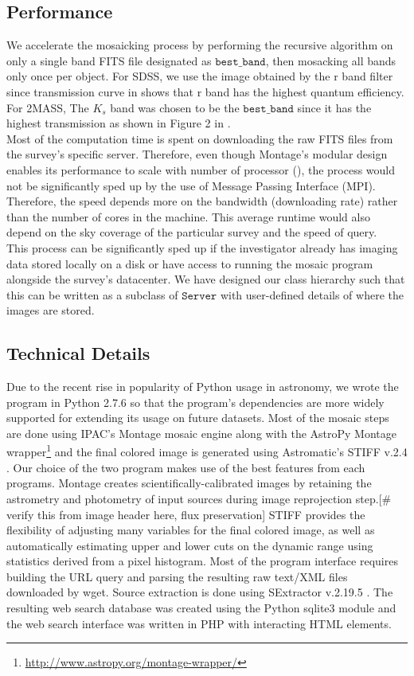 \documentclass[5p]{elsarticle}
\begin{document}
	\subsection{Performance}	
	\indent We accelerate the mosaicking process by performing the recursive algorithm on only a single band FITS file designated as $\texttt{best\_band}$, then mosacking all bands only once per object. For SDSS, we use the image obtained by the r band filter since transmission curve in \citet{edr} shows that r band has the highest quantum efficiency. For 2MASS, The $K_s$ band was chosen to be the $\texttt{best\_band}$ since it has the highest transmission as shown  in Figure 2 in \citet{2mass}.
	\\
	 \indent  Most of the computation time is spent on downloading the raw FITS files from the survey's specific server. Therefore, even though Montage's modular design enables its performance to scale with number of processor  (\citet{montage}), the process would not be significantly sped up by the use of Message Passing Interface (MPI). Therefore, the speed depends more on the bandwidth (downloading rate) rather than the number of cores in the machine. This average runtime would also depend on the sky coverage of the  particular survey and the speed of query.
	\\ \indent This process can  be significantly sped up if the investigator already has imaging data stored locally on a disk or have access to running the mosaic program alongside the survey's datacenter. We have designed our class hierarchy such that this can be written as a subclass of $\texttt{Server}$ with user-defined details of where the images are stored.
		\subsection{Technical Details}
		Due to the recent rise in popularity of Python usage in astronomy, we wrote the program in Python 2.7.6 so that the program's dependencies are more widely supported for extending its usage on future datasets. Most of the mosaic steps are done using IPAC's Montage  \cite{montage} mosaic engine along with the AstroPy Montage wrapper\footnote{\url{http://www.astropy.org/montage-wrapper/}} and the final colored image is generated using Astromatic's STIFF v.2.4 \cite{stiff}. Our choice of the two program makes use of the best features from each programs. Montage creates scientifically-calibrated images by retaining the astrometry and photometry of input sources during image reprojection step.[\# verify this from image header here, flux preservation] STIFF provides the flexibility of adjusting many variables for the final colored image, as well as automatically estimating upper and lower cuts on the dynamic range using statistics derived from a pixel histogram. Most of the program interface requires building the URL query and parsing the resulting raw text/XML files downloaded by wget. Source extraction is done using SExtractor v.2.19.5 \cite{sextractor}. The resulting web search database was created using the Python sqlite3 module and the web search interface was written in PHP with interacting HTML elements.
\end{document}
